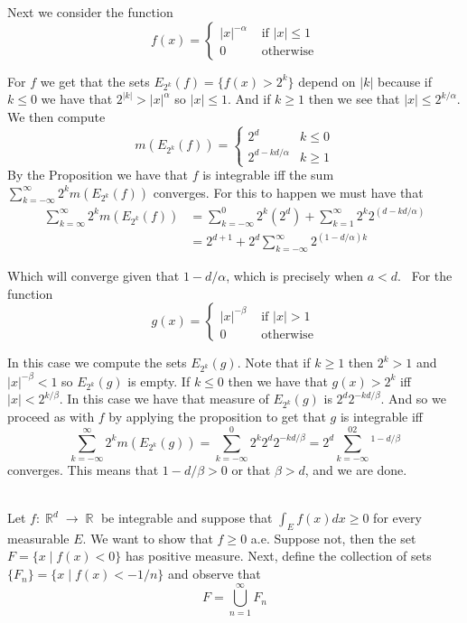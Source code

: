 \documentclass{article}
\DeclareMathOperator{\R}{\mathbb{R}}
\DeclareMathOperator{\suchthat}{\mathrel{|}}
\newcommand{\problem}[1]{\noindent{\textbf{Problem #1}}\\}
\begin{document}
Next we consider the function 
\[
f(x) = 
\begin{cases}
|x|^{-\alpha} & \text{ if }|x| \leq 1 \\
0 & \text{ otherwise}
\end{cases} 
\]

For $f$ we get that the sets $E_{2^k}(f) = \{f(x) > 2^k\}$ depend on $|k|$ because if $k \leq 0$ we have that $2^{|k|} > |x|^\alpha$ so $|x| \leq 1$. And if $k \geq 1$ then we see that $|x| \leq 2^{k/\alpha}$. We then compute 
\[
m(E_{2^k}(f)) = 
\begin{cases}
2^d & k \leq 0 \\
2^{d - kd/\alpha} & k \geq 1
\end{cases}
\]
By the Proposition we have that $f$ is integrable iff the sum $\sum_{k = -\infty}^\infty 2^km(E_{2^k}(f))$ converges. For this to happen we must have that
\begin{align*}
\sum_{k=\infty}^\infty 2^km(E_{2^k}(f)) &= \sum_{k = -\infty}^0 2^k(2^d) + \sum_{k=1}^\infty 2^k2^(d - kd/\alpha)\\
&= 2^{d+1} + 2^d\sum_{k=-\infty}^\infty 2^{(1-d/\alpha)k}
\end{align*}

Which will converge given that $1-d/\alpha$, which is precisely when $a < d$. \
For the function
\[
g(x) = 
\begin{cases}
|x|^{-\beta} & \text{ if } |x|  > 1 \\
0 & \text{ otherwise}
\end{cases}
\] 

In this case we compute the sets $E_{2^k}(g)$. Note that if $k \geq 1$ then $2^k > 1$ and $|x|^{-\beta} < 1$ so $E_{2^k}(g)$ is empty. If $k \leq 0$ then we have that $g(x) > 2^k$ iff $|x| < 2^{k/\beta}$. In this case we have that measure of $E_{2^k}(g)$ is $2^d2^{-kd/\beta}$. And so we proceed as with $f$ by applying the proposition to get that $g$ is integrable iff
\[
\sum_{k = -\infty}^\infty 2^km(E_{2^k}(g)) = \sum_{k = -\infty}^0 2^k2^d2^{-kd/\beta} = 2^d\sum_{k=-\infty}^02^{1 - d/\beta}
\]
converges. This means that $1 - d/\beta > 0$ or that $\beta > d$, and we are done. 

\problem{2.5.11} Let $f: \R^d \to \R$ be integrable and suppose that $\int_E f(x)dx \geq 0$ for every measurable $E$. We want to show that $f \geq 0$ a.e. Suppose not, then the set $F = \{x \suchthat f(x) < 0\}$ has positive measure. Next, define the collection of sets $\{F_n\} = \{x \suchthat f(x) < -1/n\}$ and observe that 
\[
F = \bigcup_{n=1}^\infty F_n
\]
\end{document}
